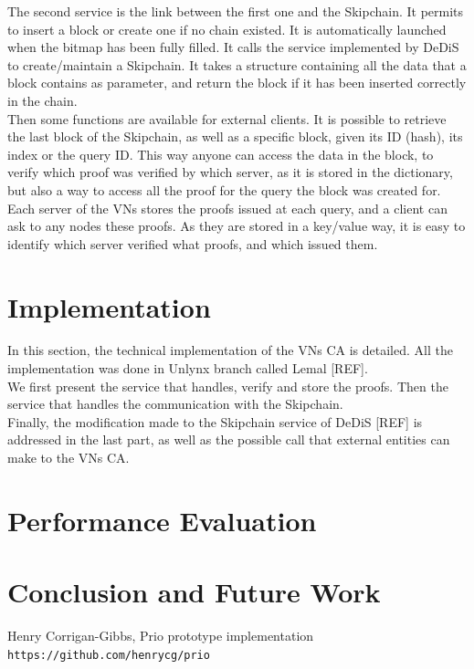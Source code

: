 \documentclass{article}
\begin{document}
The second service is the link between the first one and the Skipchain. It permits to insert a block or create one if no chain existed. It is automatically launched when the bitmap has been fully filled. It calls the service implemented by DeDiS to create/maintain a Skipchain. It takes a structure containing all the data that a block contains as parameter, and return the block if it has been inserted correctly in the chain.\\

Then some functions are available for external clients. It is possible to retrieve the last block of the Skipchain, as well as a specific block, given its ID (hash), its index or the query ID. This way anyone can access the data in the block, to verify which proof was verified by which server, as it is stored in the dictionary, but also a way to access all the proof for the query the block was created for.\\
Each server of the VNs stores the proofs issued at each query, and a client can ask to any nodes these proofs. As they are stored in a key/value way, it is easy to identify which server verified what proofs, and which issued them.
\section{Implementation}
In this section, the technical implementation of the VNs CA is detailed. All the implementation was done in Unlynx branch called Lemal [REF].\\
We first present the service that handles, verify and store the proofs. Then the service that handles the communication with the Skipchain.\\
Finally, the modification made to the Skipchain service of DeDiS [REF] is addressed in the last part, as well as the possible call that external entities can make to the VNs CA.
\section{Performance Evaluation}

\section{Conclusion and Future Work}
\begin{thebibliography}{9}
Henry Corrigan-Gibbs, Prio prototype implementation\\
\texttt{https://github.com/henrycg/prio}
\end{thebibliography}
\end{document}
